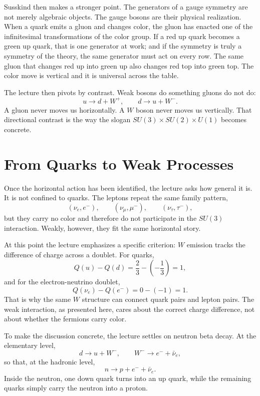 Susskind then makes a stronger point. The generators of a gauge symmetry are not merely algebraic objects. The gauge bosons are their physical realization. When a quark emits a gluon and changes color, the gluon has enacted one of the infinitesimal transformations of the color group. If a red up quark becomes a green up quark, that is one generator at work; and if the symmetry is truly a symmetry of the theory, the same generator must act on every row. The same gluon that changes red up into green up also changes red top into green top. The color move is vertical and it is universal across the table.

The lecture then pivots by contrast. Weak bosons do something gluons do not do:
\begin{equation}
u \to d + W^+,
\qquad
d \to u + W^-.
\end{equation}
A gluon never moves us horizontally. A \(W\) boson never moves us vertically. That directional contrast is the way the slogan \(SU(3)\times SU(2)\times U(1)\) becomes concrete.

\section{From Quarks to Weak Processes}

Once the horizontal action has been identified, the lecture asks how general it is. It is not confined to quarks. The leptons repeat the same family pattern,
\[
(\nu_e,e^-),\qquad (\nu_\mu,\mu^-),\qquad (\nu_\tau,\tau^-),
\]
but they carry no color and therefore do not participate in the \(SU(3)\) interaction. Weakly, however, they fit the same horizontal story.

At this point the lecture emphasizes a specific criterion: \(W\) emission tracks the difference of charge across a doublet. For quarks,
\begin{equation}
Q(u)-Q(d)=\frac{2}{3}-\left(-\frac{1}{3}\right)=1,
\end{equation}
and for the electron-neutrino doublet,
\begin{equation}
Q(\nu_e)-Q(e^-)=0-(-1)=1.
\end{equation}
That is why the same \(W\) structure can connect quark pairs and lepton pairs. The weak interaction, as presented here, cares about the correct charge difference, not about whether the fermions carry color.

To make the discussion concrete, the lecture settles on neutron beta decay. At the elementary level,
\begin{equation}
d \to u + W^-,
\qquad
W^- \to e^- + \bar{\nu}_e,
\end{equation}
so that, at the hadronic level,
\begin{equation}
n \to p + e^- + \bar{\nu}_e.
\end{equation}
Inside the neutron, one down quark turns into an up quark, while the remaining quarks simply carry the neutron into a proton.


